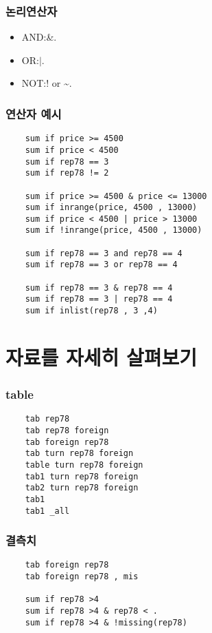 \documentclass[aspectratio=169,xcolor=dvipsnames,handout]{beamer}
\begin{document}
\begin{frame}[allowframebreaks]
    \frametitle{논리연산자}
    \begin{itemize}[<+->]
        \item AND:\@ \&.
        \item OR:\@ $|$.
        \item NOT:\@! or \textasciitilde.
    \end{itemize}
\end{frame}

\begin{frame}
    \frametitle{연산자 예시}
    \begin{verbatim}
    sum if price >= 4500
    sum if price < 4500
    sum if rep78 == 3
    sum if rep78 != 2
     
    sum if price >= 4500 & price <= 13000
    sum if inrange(price, 4500 , 13000)
    sum if price < 4500 | price > 13000
    sum if !inrange(price, 4500 , 13000)

    sum if rep78 == 3 and rep78 == 4
    sum if rep78 == 3 or rep78 == 4

    sum if rep78 == 3 & rep78 == 4
    sum if rep78 == 3 | rep78 == 4
    sum if inlist(rep78 , 3 ,4)
    \end{verbatim}
\end{frame}

\section{자료를 자세히 살펴보기}
\begin{frame}
    \frametitle{table}
    \begin{verbatim}
    tab rep78
    tab rep78 foreign
    tab foreign rep78
    tab turn rep78 foreign
    table turn rep78 foreign
    tab1 turn rep78 foreign
    tab2 turn rep78 foreign
    tab1
    tab1 _all
    \end{verbatim}
\end{frame}

\begin{frame}
    \frametitle{결측치}
    \begin{verbatim}
    tab foreign rep78
    tab foreign rep78 , mis

    sum if rep78 >4
    sum if rep78 >4 & rep78 < .
    sum if rep78 >4 & !missing(rep78)
    \end{verbatim}
\end{frame}
\end{document}
